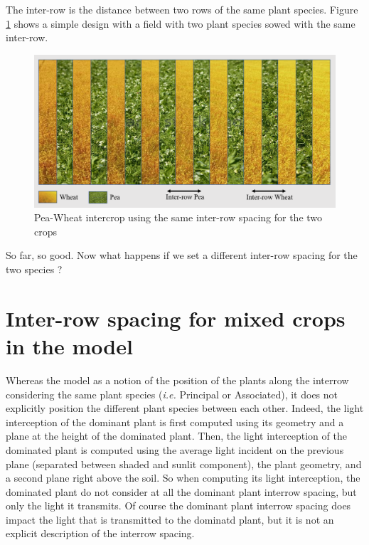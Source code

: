 \documentclass[
]{book}
\begin{document}
The inter-row is the distance between two rows of the same plant species. Figure \ref{fig:SameInterrow} shows a simple design with a field with two plant species sowed with the same inter-row.

\begin{figure}
\centering
\includegraphics{img/Same-Interrow.png}
\caption{\label{fig:SameInterrow}Pea-Wheat intercrop using the same inter-row spacing for the two crops}
\end{figure}

So far, so good. Now what happens if we set a different inter-row spacing for the two species ?

\hypertarget{inter-row-spacing-for-mixed-crops-in-the-model}{%
\section{Inter-row spacing for mixed crops in the model}\label{inter-row-spacing-for-mixed-crops-in-the-model}}

Whereas the model as a notion of the position of the plants along the interrow considering the same plant species (\emph{i.e.} Principal or Associated), it does not explicitly position the different plant species between each other. Indeed, the light interception of the dominant plant is first computed using its geometry and a plane at the height of the dominated plant. Then, the light interception of the dominated plant is computed using the average light incident on the previous plane (separated between shaded and sunlit component), the plant geometry, and a second plane right above the soil. So when computing its light interception, the dominated plant do not consider at all the dominant plant interrow spacing, but only the light it transmits. Of course the dominant plant interrow spacing does impact the light that is transmitted to the dominatd plant, but it is not an explicit description of the interrow spacing.
\end{document}
